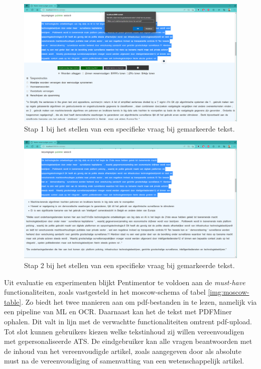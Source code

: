 \begin{center}
	\begin{figure}[H]
		\includegraphics[width=\linewidth]{img/proto-vraagstelling-1.png}
		\caption{Stap 1 bij het stellen van een specifieke vraag bij gemarkeerde tekst.}
		\label{img:step-1-proto-vraagstelling}
	\end{figure}
\end{center}

\begin{center}
	\begin{figure}[H]
		\includegraphics[width=\linewidth]{img/proto-vraagstelling-2.png}
		\caption{Stap 2 bij het stellen van een specifieke vraag bij gemarkeerde tekst.}
		\label{img:step-2-proto-vraagstelling}
	\end{figure}
\end{center}

Uit evaluatie en experimenten blijkt Pentimentor te voldoen aan de \textit{must-have} functionaliteiten, zoals vastgesteld in het moscow-schema of tabel \ref{img:moscow-table}. Zo biedt het twee manieren aan om pdf-bestanden in te lezen, namelijk via een pipeline van ML en OCR. Daarnaast kan het de tekst met PDFMiner ophalen. Dit valt in lijn met de verwachtte functionaliteiten omtrent pdf-upload. Tot slot kunnen gebruikers kiezen welke tekstinhoud zij willen vereenvoudigen met gepersonaliseerde ATS. De eindgebruiker kan alle vragen beantwoorden met de inhoud van het vereenvoudigde artikel, zoals aangegeven door \textcite{Hollenkamp2020} als absolute must na de vereenvoudiging of samenvatting van een wetenschappelijk artikel.

